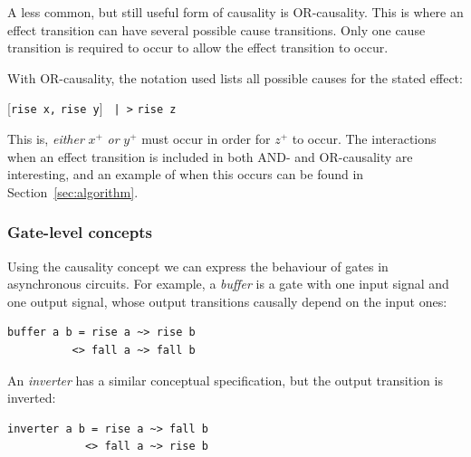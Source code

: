 \documentclass[british, 10pt, conference, compsocconf]{IEEEtran}
\begin{document}
A less common, but still useful form of causality is OR-causality. This is 
where an effect transition can have several possible cause transitions. Only 
one cause transition is required to occur to allow the effect transition to 
occur. 

With OR-causality, the notation used lists all possible causes for the stated 
effect:

\vspace{-1.5mm}

\begin{center}
      [\texttt{rise x,} \texttt{rise y}] \texttt{~|~>} \texttt{rise z}
\end{center}

\vspace{-1mm}

This is, \emph{either} $x^{+}$ \emph{or} $y^{+}$ must occur in order for 
$z^{+}$ to occur. The interactions when an effect transition is included in both AND- and 
OR-causality are interesting, and an example of when this occurs can be found 
in Section~\ref{sec:algorithm}.


\subsubsection{Gate-level concepts \label{subsub:gate-level}} Using the causality concept we can express
the behaviour of gates in asynchronous circuits. For example, a \emph{buffer}
is a gate with one input signal and one output signal,
whose output transitions causally depend on the input ones:

\begin{verbatim}
buffer a b = rise a ~> rise b 
          <> fall a ~> fall b
\end{verbatim}

\noindent An \emph{inverter} has a similar conceptual specification, but the
output transition is inverted:

\vspace{-1mm}

\begin{verbatim}
inverter a b = rise a ~> fall b
            <> fall a ~> rise b
\end{verbatim}

\vspace{-1mm}
\end{document}
